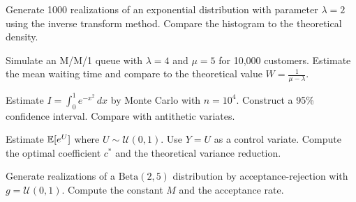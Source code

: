 \begin{exercise}
Generate 1000 realizations of an exponential distribution with parameter
$\lambda = 2$ using the inverse transform method. Compare the histogram to
the theoretical density.
\end{exercise}

\begin{exercise}
Simulate an M/M/1 queue with $\lambda = 4$ and $\mu = 5$ for 10,000
customers. Estimate the mean waiting time and compare to the theoretical
value $W = \frac{1}{\mu - \lambda}$.
\end{exercise}

\begin{exercise}
Estimate $I = \int_0^1 e^{-x^2}\,dx$ by Monte Carlo with $n = 10^4$.
Construct a 95\% confidence interval. Compare with antithetic variates.
\end{exercise}

\begin{exercise}
Estimate $\mathbb{E}[e^U]$ where $U \sim \mathcal{U}(0,1)$. Use $Y = U$ as a control
variate. Compute the optimal coefficient $c^*$ and the theoretical variance
reduction.
\end{exercise}

\begin{exercise}
Generate realizations of a $\mathrm{Beta}(2,5)$ distribution by
acceptance-rejection with $g = \mathcal{U}(0,1)$. Compute the constant $M$
and the acceptance rate.
\end{exercise}
